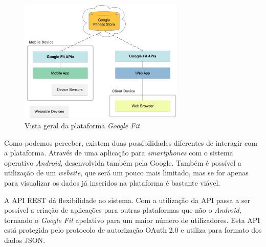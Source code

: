 \begin{figure}[!ht]
  \centering
  \includegraphics[width=0.7\textwidth]{imgs/googleFitOverview.png}
  \caption[Vista geral da plataforma \textit{Google Fit}]{Vista geral da plataforma \textit{Google Fit} \cite{googlefit}}
  
  \label{f:googleFitOverview}
\end{figure}

Como podemos perceber, existem duas possibilidades diferentes de interagir com a plataforma. Através de uma aplicação para \textit{smartphones} com o sistema operativo \textit{Android}, desenvolvida também pela Google.  Também é possível a utilização de um \textit{website}, que será um pouco mais limitado, mas se for apenas para visualizar os dados já inseridos na plataforma é bastante viável.

A \gls{API} \gls{REST} dá flexibilidade ao sistema. Com a utilização da \gls{API} passa a ser possível a criação de aplicações para outras plataformas que não o \textit{Android}, tornando o \textit{Google Fit} apelativo para um maior número de utilizadores. Esta \gls{API} está protegida pelo protocolo de autorização OAuth 2.0 e utiliza para formato dos dados \gls{JSON}\cite{googlegetstarted}. 




